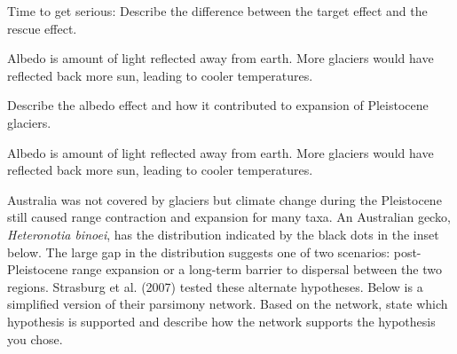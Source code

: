 \documentclass[11pt]{exam}
\begin{document}
\begin{questions}

\question[10]
Time to get serious: Describe the difference between the target effect and the rescue effect.

	\begin{solution}
	Albedo is amount of light reflected away from earth. More glaciers would have reflected back more sun, leading to cooler temperatures.
	\end{solution}

\vspace{3in}


\question[10]
Describe the albedo effect and how it contributed to expansion of Pleistocene glaciers.

	\begin{solution}
	Albedo is amount of light reflected away from earth. More glaciers would have reflected back more sun, leading to cooler temperatures.
	\end{solution}





\newpage

\question[15]
Australia was not covered by glaciers but climate change during the Pleistocene still caused range contraction and expansion for many taxa.  An Australian gecko, \textit{Heteronotia binoei}, has the distribution indicated by the black dots in the inset below.  The large gap in the distribution suggests one of two scenarios: post-Pleistocene range expansion or a long-term barrier to dispersal between the two regions. Strasburg et al. (2007) tested these alternate hypotheses. Below is a simplified version of their parsimony network.  Based on the network, state which hypothesis is supported and describe how the network supports the hypothesis you chose. 


\end{questions}
\end{document}
